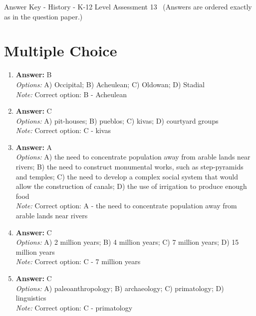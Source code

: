 \documentclass[12pt]{article}
\begin{document}
\begin{center}
Answer Key - History - K-12 Level Assessment 13 \
\small (Answers are ordered exactly as in the question paper.)
\end{center}

\section*{Multiple Choice}
\begin{enumerate}[label=\arabic*.]
\item \textbf{Answer:} B
\\ \textit{Options:} A) Occipital; B) Acheulean; C) Oldowan; D) Stadial
\\ \textit{Note:} Correct option: B - Acheulean
\item \textbf{Answer:} C
\\ \textit{Options:} A) pit-houses; B) pueblos; C) kivas; D) courtyard groups
\\ \textit{Note:} Correct option: C - kivas
\item \textbf{Answer:} A
\\ \textit{Options:} A) the need to concentrate population away from arable lands near rivers; B) the need to construct monumental works, such as step-pyramids and temples; C) the need to develop a complex social system that would allow the construction of canals; D) the use of irrigation to produce enough food
\\ \textit{Note:} Correct option: A - the need to concentrate population away from arable lands near rivers
\item \textbf{Answer:} C
\\ \textit{Options:} A) 2 million years; B) 4 million years; C) 7 million years; D) 15 million years
\\ \textit{Note:} Correct option: C - 7 million years
\item \textbf{Answer:} C
\\ \textit{Options:} A) paleoanthropology; B) archaeology; C) primatology; D) linguistics
\\ \textit{Note:} Correct option: C - primatology
\end{enumerate}
\end{document}
